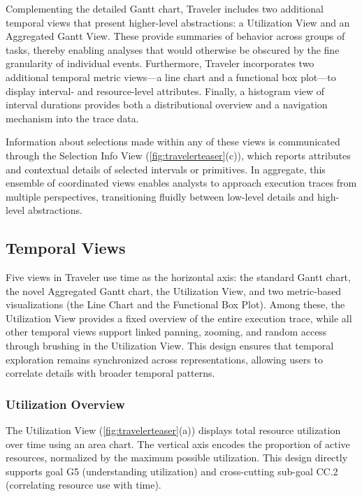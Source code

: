 \begin{refsection}
Complementing the detailed Gantt chart, Traveler includes two additional temporal views that present higher-level abstractions: a Utilization View and an Aggregated Gantt View. These provide summaries of behavior across groups of tasks, thereby enabling analyses that would otherwise be obscured by the fine granularity of individual events. Furthermore, Traveler incorporates two additional temporal metric views---a line chart and a functional box plot---to display interval- and resource-level attributes. Finally, a histogram view of interval durations provides both a distributional overview and a navigation mechanism into the trace data. 

Information about selections made within any of these views is communicated through the Selection Info View (\autoref{fig:travelerteaser}(c)), which reports attributes and contextual details of selected intervals or primitives. In aggregate, this ensemble of coordinated views enables analysts to approach execution traces from multiple perspectives, transitioning fluidly between low-level details and high-level abstractions.

\subsection{Temporal Views}
\label{subsec:temporal_views}

Five views in Traveler use time as the horizontal axis: the standard Gantt chart, the novel Aggregated Gantt chart, the Utilization View, and two metric-based visualizations (the Line Chart and the Functional Box Plot). Among these, the Utilization View provides a fixed overview of the entire execution trace, while all other temporal views support linked panning, zooming, and random access through brushing in the Utilization View. This design ensures that temporal exploration remains synchronized across representations, allowing users to correlate details with broader temporal patterns.

\subsubsection{Utilization Overview} 
\label{subsec:utilization}

The Utilization View (\autoref{fig:travelerteaser}(a)) displays total resource utilization over time using an area chart. The vertical axis encodes the proportion of active resources, normalized by the maximum possible utilization. This design directly supports goal G5 (understanding utilization) and cross-cutting sub-goal CC.2 (correlating resource use with time). 


\end{refsection}
